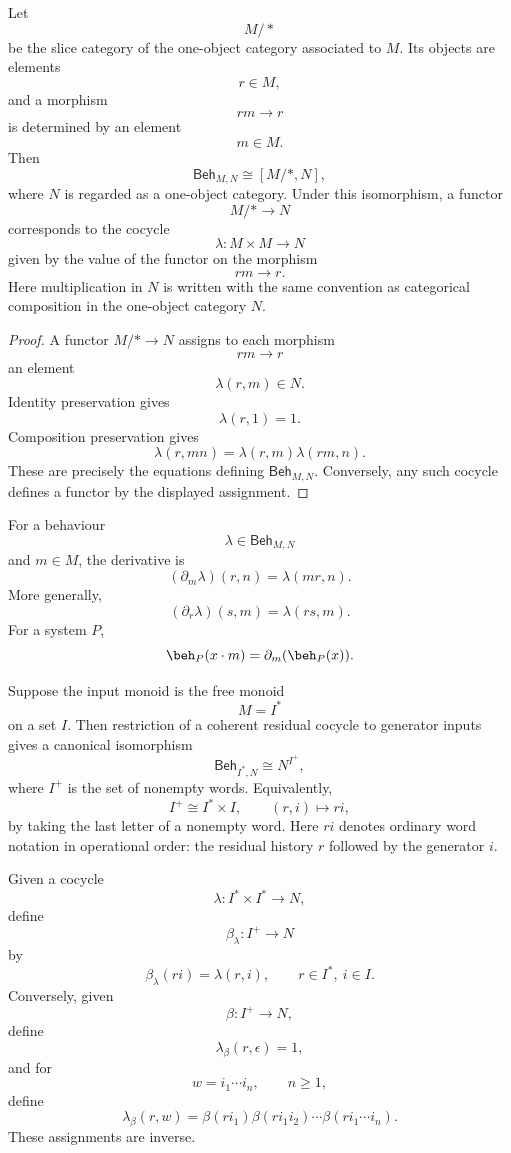 \begin{proposition}
\label{prop:one-object-residual-slice-form}
Let
\[
M/\ast
\]
be the slice category of the one-object category associated to \(M\). Its
objects are elements
\[
r\in M,
\]
and a morphism
\[
rm\to r
\]
is determined by an element
\[
m\in M.
\]
Then
\[
\mathsf{Beh}_{M,N}
\cong
[M/\ast,N],
\]
where \(N\) is regarded as a one-object category. Under this isomorphism, a
functor
\[
M/\ast\to N
\]
corresponds to the cocycle
\[
\lambda:M\times M\to N
\]
given by the value of the functor on the morphism
\[
rm\to r.
\]
Here multiplication in \(N\) is written with the same convention as
categorical composition in the one-object category \(N\).
\end{proposition}

\begin{proof}
A functor \(M/\ast\to N\) assigns to each morphism
\[
rm\to r
\]
an element
\[
\lambda(r,m)\in N.
\]
Identity preservation gives
\[
\lambda(r,1)=1.
\]
Composition preservation gives
\[
\lambda(r,mn)=\lambda(r,m)\lambda(rm,n).
\]
These are precisely the equations defining \(\mathsf{Beh}_{M,N}\). Conversely,
any such cocycle defines a functor by the displayed assignment.
\end{proof}

\begin{example}
\label{ex:monoid-derivatives}
For a behaviour
\[
\lambda\in\mathsf{Beh}_{M,N}
\]
and \(m\in M\), the derivative is
\[
(\partial_m\lambda)(r,n)=\lambda(mr,n).
\]
More generally,
\[
(\partial_r\lambda)(s,m)=\lambda(rs,m).
\]
For a system \(P\),
\[
\beh_P(x\cdot m)=\partial_m(\beh_P(x)).
\]
\end{example}

\begin{corollary}
\label{cor:free-input-classical-behaviour-object}
Suppose the input monoid is the free monoid
\[
M=I^\ast
\]
on a set \(I\). Then restriction of a coherent residual cocycle to generator
inputs gives a canonical isomorphism
\[
\mathsf{Beh}_{I^\ast,N}
\cong
N^{I^+},
\]
where \(I^+\) is the set of nonempty words. Equivalently,
\[
I^+\cong I^\ast\times I,
\qquad
(r,i)\longmapsto ri,
\]
by taking the last letter of a nonempty word. Here \(ri\) denotes ordinary
word notation in operational order: the residual history \(r\) followed by
the generator \(i\).

Given a cocycle
\[
\lambda:I^\ast\times I^\ast\to N,
\]
define
\[
\beta_\lambda:I^+\to N
\]
by
\[
\beta_\lambda(ri)=\lambda(r,i),
\qquad
r\in I^\ast,\ i\in I.
\]
Conversely, given
\[
\beta:I^+\to N,
\]
define
\[
\lambda_\beta(r,\epsilon)=1,
\]
and for
\[
w=i_1\cdots i_n,
\qquad n\ge1,
\]
define
\[
\lambda_\beta(r,w)
=
\beta(ri_1)
\beta(ri_1i_2)
\cdots
\beta(ri_1\cdots i_n).
\]
These assignments are inverse.
\end{corollary}

